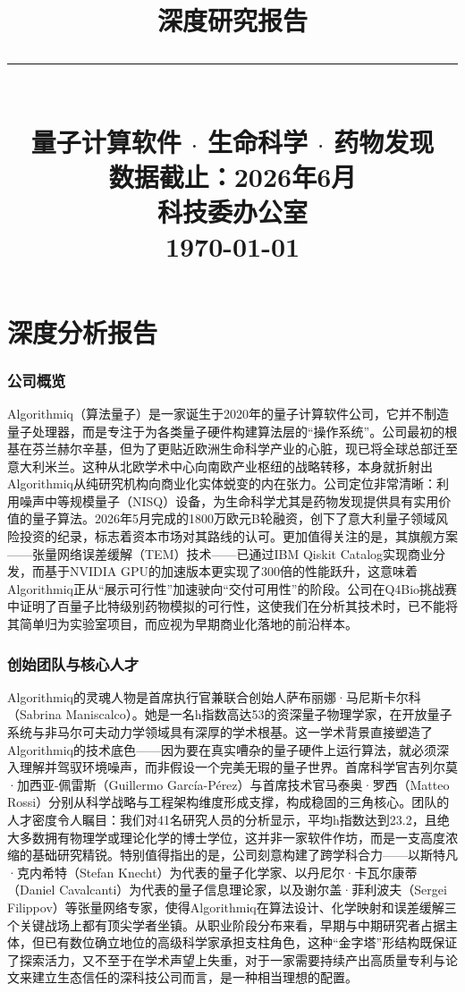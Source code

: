 \documentclass[11pt,a4paper]{ctexart}
\title{\vspace{2cm}{\Huge\bfseries\color{mainred} Algorithmiq\\[6pt] \mbox{}}\\[12pt]{\large 深度研究报告}\\[24pt]\rule{0.5\textwidth}{1.5pt}\\[16pt]{\large 量子计算软件 $\cdot$ 生命科学 $\cdot$ 药物发现}\\[8pt]{\footnotesize\color{graytext}数据截止：2026年6月}\\[8pt]{\large 科技委办公室}\\[16pt]{\large\color{graytext}\today}}
\date{}
\begin{document}
\maketitle\thispagestyle{empty}
\newpage\tableofcontents\newpage
\part{深度分析报告}
\section{公司概览}
Algorithmiq（算法量子）是一家诞生于2020年的量子计算软件公司，它并不制造量子处理器，而是专注于为各类量子硬件构建算法层的“操作系统”。公司最初的根基在芬兰赫尔辛基，但为了更贴近欧洲生命科学产业的心脏，现已将全球总部迁至意大利米兰。这种从北欧学术中心向南欧产业枢纽的战略转移，本身就折射出Algorithmiq从纯研究机构向商业化实体蜕变的内在张力。公司定位非常清晰：利用噪声中等规模量子（NISQ）设备，为生命科学尤其是药物发现提供具有实用价值的量子算法。2026年5月完成的1800万欧元B轮融资，创下了意大利量子领域风险投资的纪录，标志着资本市场对其路线的认可。更加值得关注的是，其旗舰方案——张量网络误差缓解（TEM）技术——已通过IBM Qiskit Catalog实现商业分发，而基于NVIDIA GPU的加速版本更实现了300倍的性能跃升，这意味着Algorithmiq正从“展示可行性”加速驶向“交付可用性”的阶段。公司在Q4Bio挑战赛中证明了百量子比特级别药物模拟的可行性，这使我们在分析其技术时，已不能将其简单归为实验室项目，而应视为早期商业化落地的前沿样本。

\section{创始团队与核心人才}
Algorithmiq的灵魂人物是首席执行官兼联合创始人萨布丽娜·马尼斯卡尔科（Sabrina Maniscalco）。她是一名h指数高达53的资深量子物理学家，在开放量子系统与非马尔可夫动力学领域具有深厚的学术根基。这一学术背景直接塑造了Algorithmiq的技术底色——因为要在真实嘈杂的量子硬件上运行算法，就必须深入理解并驾驭环境噪声，而非假设一个完美无瑕的量子世界。首席科学官吉列尔莫·加西亚-佩雷斯（Guillermo García-Pérez）与首席技术官马泰奥·罗西（Matteo Rossi）分别从科学战略与工程架构维度形成支撑，构成稳固的三角核心。团队的人才密度令人瞩目：我们对41名研究人员的分析显示，平均h指数达到23.2，且绝大多数拥有物理学或理论化学的博士学位，这并非一家软件作坊，而是一支高度浓缩的基础研究精锐。特别值得指出的是，公司刻意构建了跨学科合力——以斯特凡·克内希特（Stefan Knecht）为代表的量子化学家、以丹尼尔·卡瓦尔康蒂（Daniel Cavalcanti）为代表的量子信息理论家，以及谢尔盖·菲利波夫（Sergei Filippov）等张量网络专家，使得Algorithmiq在算法设计、化学映射和误差缓解三个关键战场上都有顶尖学者坐镇。从职业阶段分布来看，早期与中期研究者占据主体，但已有数位确立地位的高级科学家承担支柱角色，这种“金字塔”形结构既保证了探索活力，又不至于在学术声望上失重，对于一家需要持续产出高质量专利与论文来建立生态信任的深科技公司而言，是一种相当理想的配置。
\end{document}
